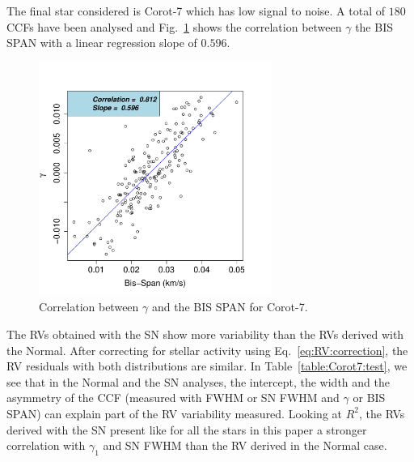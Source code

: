 \documentclass[11pt, oneside]{article}
\begin{document}
The final star considered is Corot-7 which has low signal to noise. A total of $180$ CCFs have been analysed and Fig.~\ref{fig:Corot7:corr.gamma} shows the correlation between $\gamma$ the BIS SPAN with a linear regression slope of $0.596$.
%
\begin{figure}[htbp]
   \centering
\includegraphics[height = 3in]{LRa01_E_[2]gamma_vs_bisspan.pdf} 
   \caption{Correlation between $\gamma$ and the BIS SPAN for Corot-7.}
   \label{fig:Corot7:corr.gamma}
\end{figure}

The RVs obtained with the SN show more variability than the RVs derived with the Normal. After correcting for stellar activity using Eq.~\ref{eq:RV:correction}, the RV residuals with both distributions are similar. In Table~\ref{table:Corot7:test}, we see that in the Normal and the SN analyses, the intercept, the width and the asymmetry of the CCF (measured with FWHM or SN FWHM and $\gamma$ or BIS SPAN) can explain part of the RV variability measured. Looking at $R^2$, the RVs derived with the SN present like for all the stars in this paper a stronger correlation with $\gamma_1$ and SN FWHM than the RV derived in the Normal case.
\end{document}
